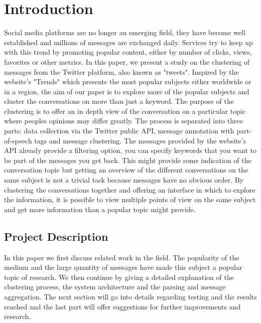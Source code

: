 \chapter{Introduction}
\label{chapter:intro}

Social media platforms are no longer an emerging field, they have become well established and millions of messages are exchanged daily. Services try to keep up with this trend by promoting popular content, either by number of clicks, views, favorites or other metrics. In this paper, we present a study on the clustering of messages from the Twitter platform, also known as "tweets". Inspired by the website's "Trends" which presents the most popular subjects either worldwide or in a region, the aim of our paper is to explore more of the popular subjects and cluster the conversations on more than just a keyword. The purpose of the clustering is to offer an in depth view of the conversation on a particular topic where peoples opinions may differ greatly.
\newline
The process is separated into three parts: data collection via the Twitter public API, message annotation with part-of-speech tags and message clustering. The messages provided by the website's API already provide a filtering option, you can specify keywords that you want to be part of the messages you get back. This might provide some indication of the conversation topic but getting an overview of the different conversations on the same subject is not a trivial task because messages have no obvious order.
\newline
By clustering the conversations together and offering an interface in which to explore the information, it is possible to view multiple points of view on the same subject and get more information than a popular topic might provide.

\section{Project Description}
\label{sec:proj}

In this paper we first discuss related work in the field. The popularity of the medium and the large quantity of messages have made this subject a popular topic of research. We then continue by giving a detailed explanation of the clustering process, the system architecture and the parsing and message aggregation. The next section will go into details regarding testing and the results reached and the last part will offer suggestions for further improvements and research.

